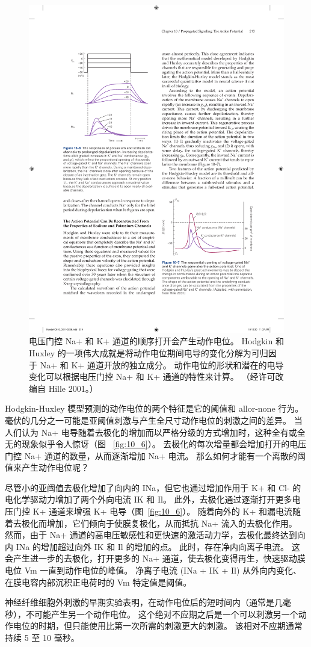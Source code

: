 \begin{figure}[htbp]
	\centering
	\includegraphics[width=0.5\linewidth]{chap10/fig_10_7}
	\caption{电压门控 Na+ 和 K+ 通道的顺序打开会产生动作电位。 Hodgkin 和 Huxley 的一项伟大成就是将动作电位期间电导的变化分解为可归因于 Na+ 和 K+ 通道开放的独立成分。 动作电位的形状和潜在的电导变化可以根据电压门控 Na+ 和 K+ 通道的特性来计算。 （经许可改编自 Hille 2001。）}
	\label{fig:10_7}
\end{figure}


Hodgkin-Huxley 模型预测的动作电位的两个特征是它的阈值和 allor-none 行为。
毫伏的几分之一可能是亚阈值刺激与产生全尺寸动作电位的刺激之间的差异。
当人们认为 Na+ 电导随着去极化的增加而以严格分级的方式增加时，这种全有或全无的现象似乎令人惊讶（图 ~\ref{fig:10_6}）。 
去极化的每次增量都会增加打开的电压门控 Na+ 通道的数量，从而逐渐增加 Na+ 电流。
那么如何才能有一个离散的阈值来产生动作电位呢？


尽管小的亚阈值去极化增加了向内的 INa，但它也通过增加作用于 K+ 和 Cl- 的电化学驱动力增加了两个外向电流 IK 和 Il。
此外，去极化通过逐渐打开更多电压门控 K+ 通道来增强 K+ 电导（图~\ref{fig:10_6}）。 
随着向外的 K+ 和漏电流随着去极化而增加，它们倾向于使膜复极化，从而抵抗 Na+ 流入的去极化作用。
然而，由于 Na+ 通道的高电压敏感性和更快速的激活动力学，去极化最终达到向内 INa 的增加超过向外 IK 和 Il 的增加的点。
此时，存在净内向离子电流。
这会产生进一步的去极化，打开更多的 Na+ 通道，使去极化变得再生，快速驱动膜电位 Vm 一直到动作电位的峰值。
净离子电流 (INa + IK + Il) 从外向内变化、在膜电容内部沉积正电荷时的 Vm 特定值是阈值。


神经纤维细胞外刺激的早期实验表明，在动作电位后的短时间内（通常是几毫秒），不可能产生另一个动作电位。 
这个绝对不应期之后是一个可以刺激另一个动作电位的时期，但只能使用比第一次所需的刺激更大的刺激。 
该相对不应期通常持续 5 至 10 毫秒。


